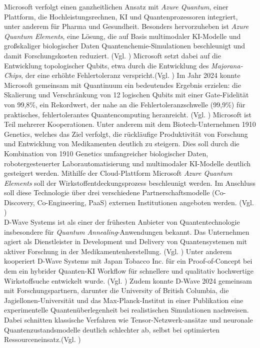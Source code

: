 Microsoft verfolgt einen ganzheitlichen Ansatz mit \textit{Azure Quantum}, einer Plattform, die Hochleistungsrechnen, KI und Quantenprozessoren integriert, unter anderem für Pharma und Gesundheit. Besonders hervorzuheben ist \textit{Azure Quantum Elements}, eine Lösung, die auf Basis multimodaler KI-Modelle und großskaliger biologischer Daten Quantenchemie-Simulationen beschleunigt und damit Forschungskosten reduziert. (Vgl. \cite{buntzMicrosoftEyesQuantum2023}) 
Microsoft setzt dabei auf die Entwicklung topologischer Qubits, etwa durch die Entwicklung des \textit{Majorana-Chips}, der eine erhöhte Fehlertoleranz verspricht.(Vgl. \cite{aasenRoadmapFaultTolerant2025, aghaeeInterferometricSingleshotParity2025}) 
Im Jahr 2024 konnte Microsoft gemeinsam mit Quantinuum ein bedeutendes Ergebnis erzielen: die Skalierung und Verschränkung von 12 logischen Qubits mit einer Gate-Fidelität von 99,8\%, ein Rekordwert, der nahe an die Fehlertoleranzschwelle (99,9\%) für praktisches, fehlertolerantes Quantencomputing heranreicht. (Vgl. \cite{reichardtDemonstrationQuantumComputation2024}) 
Microsoft ist Teil mehrerer Kooperationen. Unter anderem mit dem Biotech-Unternehmen 1910 Genetics, welches das Ziel verfolgt, die rückläufige Produktivität von Forschung und Entwicklung von  Medikamenten deutlich zu steigern. Dies soll durch die Kombination von 1910 Genetics umfangreicher biologischer Daten, robotergesteuerter Laborautomatisierung und multimodaler KI-Modelle deutlich gesteigert werden. Mithilfe der Cloud-Plattform Microsoft \textit{Azure Quantum Elements} soll der Wirkstoffentdeckungsprozess beschleunigt werden. Im Anschluss soll diese Technologie über drei verschiedene Partnerschaftsmodelle (Co-Discovery, Co-Engineering, PaaS) externen Institutionen angeboten werden. (Vgl. \cite{alamMicrosoft1910Genetics2024})\\

D-Wave Systems ist als einer der frühesten Anbieter von Quantentechnologie insbesondere für  \textit{Quantum Annealing}-Anwendungen bekannt. Das Unternehmen agiert als Dienstleister in Development und Delivery von Quantensystemen mit aktiver Forschung in der Medikamentenherstellung. (Vgl. \cite{flahertyDWaveLooksLarge2024}) 
Unter anderem kooperiert D-Wave Systems mit Japan Tobacco Inc. für ein Proof-of-Concept bei dem ein hybrider Quanten-KI Workflow für schnellere und qualitativ hochwertige Wirkstoffsuche entwickelt wurde. (Vgl. \cite{JapanTobaccoInc2024})
Zudem konnte D-Wave 2024 gemeinsam mit Forschungspartnern, darunter die University of British Columbia, die Jagiellonen-Universität und das Max-Planck-Institut in einer Publikation eine experimentelle Quantenüberlegenheit bei realistischen Simulationen nachweisen. Dabei schnitten klassische Verfahren wie Tensor-Netzwerk-ansätze und neuronale Quantenzustandsmodelle deutlich schlechter ab, selbst bei optimierten Ressourceneinsatz.(Vgl. \cite{kingComputationalSupremacyQuantum2024})\\

